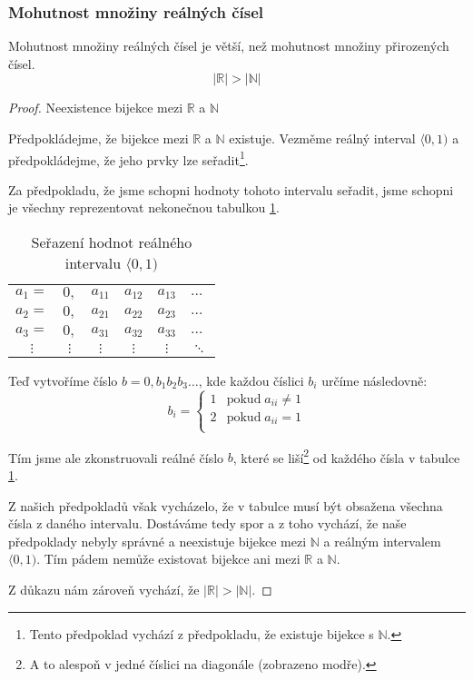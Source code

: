 \subsubsection*{Mohutnost množiny reálných čísel}
Mohutnost množiny reálných čísel je větší, než mohutnost množiny přirozených čísel.
$$|\mathbb{R}| > |\mathbb{N}|$$
\begin{proof}
    Neexistence bijekce mezi $\mathbb{R}$ a $\mathbb{N}$

    Předpokládejme, že bijekce mezi $\mathbb{R}$ a $\mathbb{N}$ existuje.
    Vezměme reálný interval $\langle0, 1)$ a předpokládejme, že jeho prvky lze seřadit\footnote{Tento
    předpoklad vychází z předpokladu, že existuje bijekce s $\mathbb{N}$.}.

    Za předpokladu, že jsme schopni hodnoty tohoto intervalu seřadit, jsme schopni
    je všechny reprezentovat nekonečnou tabulkou \ref{tab:diag_real}.


\begin{table}[]
    \centering
    \begin{tabular}{cccccl}
    $a_1 = $ & $0,$     & \cellcolor[HTML]{3166FF}$a_{11}$ & $a_{12}$                         & $a_{13}$                         & $\dots$  \\
    $a_2 = $ & $0,$     & $a_{21}$                         & \cellcolor[HTML]{3166FF}$a_{22}$ & $a_{23}$                         & $\dots$  \\
    $a_3 = $ & $0,$     & $a_{31}$                         & $a_{32}$                         & \cellcolor[HTML]{3166FF}$a_{33}$ & $\dots$  \\
    $\vdots$ & $\vdots$ & $\vdots$                         & $\vdots$                         & $\vdots$                         & $\ddots$
    \end{tabular}
    \caption{Seřazení hodnot reálného intervalu $\langle 0, 1)$}
    \label{tab:diag_real}
\end{table}

    Teď vytvoříme číslo $b = 0,b_1 b_2 b_3 \ldots$, kde každou číslici $b_i$ určíme následovně:
    \[
    b_i =
    \left\{
    \begin{array}{ll}
        1 & \text{pokud} \; a_{ii} \neq 1\\
        2 & \text{pokud} \; a_{ii} = 1   \\
    \end{array}
    \right.
\]

    Tím jsme ale zkonstruovali reálné číslo $b$, které se liší\footnote{A to alespoň v
    jedné číslici na diagonále (zobrazeno modře).} od každého čísla v tabulce
    \ref{tab:diag_real}.

    Z našich předpokladů však vycházelo, že v tabulce musí být obsažena všechna čísla z daného
    intervalu. Dostáváme tedy spor a z toho vychází, že naše předpoklady nebyly správné a
    neexistuje bijekce mezi $\mathbb{N}$ a reálným intervalem $\langle 0, 1)$. Tím pádem nemůže
    existovat bijekce ani mezi $\mathbb{R}$ a $\mathbb{N}$.

    Z důkazu nám zároveň vychází, že $|\mathbb{R}| > |\mathbb{N}|$.
\end{proof}

